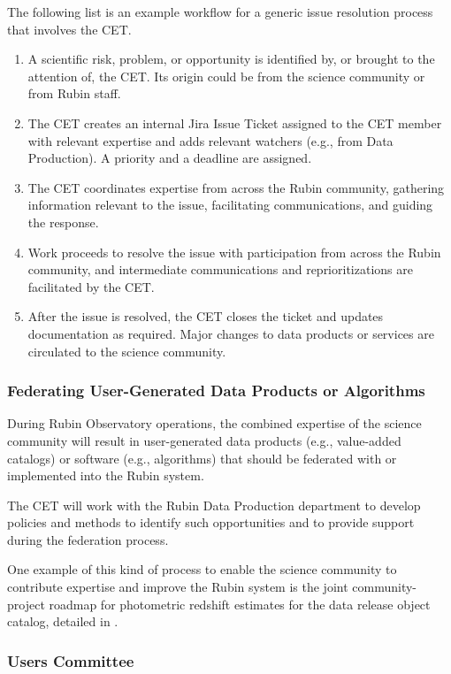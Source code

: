 \documentclass[DM,lsstdraft,toc]{lsstdoc}
\begin{document}
The following list is an example workflow for a generic issue resolution process that involves the CET.
\begin{enumerate}
\item A scientific risk, problem, or opportunity is identified by, or brought to the attention of, the CET. Its origin could be from the science community or from Rubin staff.
\item The CET creates an internal Jira Issue Ticket assigned to the CET member with relevant expertise and adds relevant watchers (e.g., from Data Production). A priority and a deadline are assigned. 
\item The CET coordinates expertise from across the Rubin community, gathering information relevant to the issue, facilitating communications, and guiding the response.
\item Work proceeds to resolve the issue with participation from across the Rubin community, and intermediate communications and reprioritizations are facilitated by the CET.
\item After the issue is resolved, the CET closes the ticket and updates documentation as required. Major changes to data products or services are circulated to the science community.
\end{enumerate}


\subsubsection{Federating User-Generated Data Products or Algorithms}\label{sssec:mod_coord_ug}

During Rubin Observatory operations, the combined expertise of the science community will result in user-generated data products (e.g., value-added catalogs) or software (e.g., algorithms) that should be federated with or implemented into the Rubin system.

The CET will work with the Rubin Data Production department to develop policies and methods to identify such opportunities and to provide support during the federation process.

One example of this kind of process to enable the science community to contribute expertise and improve the Rubin system is the joint community-project roadmap for photometric redshift estimates for the data release object catalog, detailed in .


\subsubsection{Users Committee}\label{sssec:mod_coord_uc}
\end{document}
